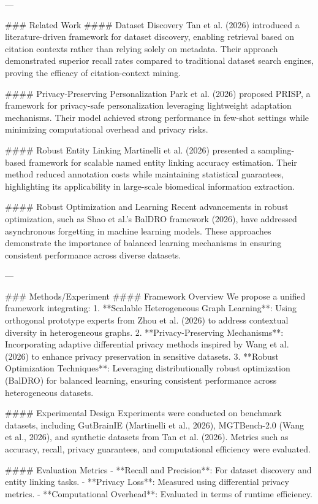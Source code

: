 ---

### Related Work
#### Dataset Discovery
Tan et al. (2026) introduced a literature-driven framework for dataset discovery, enabling retrieval based on citation contexts rather than relying solely on metadata. Their approach demonstrated superior recall rates compared to traditional dataset search engines, proving the efficacy of citation-context mining.

#### Privacy-Preserving Personalization
Park et al. (2026) proposed PRISP, a framework for privacy-safe personalization leveraging lightweight adaptation mechanisms. Their model achieved strong performance in few-shot settings while minimizing computational overhead and privacy risks.

#### Robust Entity Linking
Martinelli et al. (2026) presented a sampling-based framework for scalable named entity linking accuracy estimation. Their method reduced annotation costs while maintaining statistical guarantees, highlighting its applicability in large-scale biomedical information extraction.

#### Robust Optimization and Learning
Recent advancements in robust optimization, such as Shao et al.'s BalDRO framework (2026), have addressed asynchronous forgetting in machine learning models. These approaches demonstrate the importance of balanced learning mechanisms in ensuring consistent performance across diverse datasets.

---

### Methods/Experiment
#### Framework Overview
We propose a unified framework integrating:
1. **Scalable Heterogeneous Graph Learning**: Using orthogonal prototype experts from Zhou et al. (2026) to address contextual diversity in heterogeneous graphs.
2. **Privacy-Preserving Mechanisms**: Incorporating adaptive differential privacy methods inspired by Wang et al. (2026) to enhance privacy preservation in sensitive datasets.
3. **Robust Optimization Techniques**: Leveraging distributionally robust optimization (BalDRO) for balanced learning, ensuring consistent performance across heterogeneous datasets.

#### Experimental Design
Experiments were conducted on benchmark datasets, including GutBrainIE (Martinelli et al., 2026), MGTBench-2.0 (Wang et al., 2026), and synthetic datasets from Tan et al. (2026). Metrics such as accuracy, recall, privacy guarantees, and computational efficiency were evaluated. 

#### Evaluation Metrics
- **Recall and Precision**: For dataset discovery and entity linking tasks.
- **Privacy Loss**: Measured using differential privacy metrics.
- **Computational Overhead**: Evaluated in terms of runtime efficiency.

